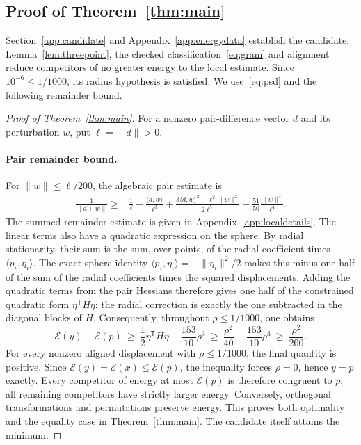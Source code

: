 \documentclass[11pt]{article}
\newcommand{\E}{\mathcal{E}}
\begin{document}
\subsection{Proof of Theorem~\ref{thm:main}}\label{sec:mainproof}
Section~\ref{app:candidate} and Appendix~\ref{app:energydata} establish the candidate.
Lemma~\ref{lem:threepoint}, the checked classification~\eqref{eq:gram} and alignment
reduce competitors of no greater energy to the local estimate.
Since $10^{-6}\leq1/1000$, its radius hypothesis is satisfied.
We use~\eqref{eq:psd} and the following remainder bound.
\begin{proof}[Proof of Theorem~\ref{thm:main}]
For a nonzero pair-difference vector $d$ and its
perturbation $w$, put $\ell=\|d\|>0$.

\paragraph{Pair remainder bound.}
For $\|w\|\leq \ell/200$, the algebraic pair estimate is
\begin{align}
 \frac1{\|d+w\|}\geq{}&\frac1\ell-\frac{\langle d,w\rangle}{\ell^3}
 +\frac{3\langle d,w\rangle^2-\ell^2\|w\|^2}{2\ell^5}
 -\frac{51}{50}\frac{\|w\|^3}{\ell^4}.\label{eq:remainder}
\end{align}
The summed remainder estimate is given in Appendix~\ref{app:localdetails}.
The linear terms also have a quadratic expression on the sphere.
By radial stationarity, their sum is the sum, over points, of the radial
coefficient times $\langle p_i,\eta_i\rangle$. The exact sphere identity
$\langle p_i,\eta_i\rangle=-\|\eta_i\|^2/2$ makes this minus one half of the
sum of the radial coefficients times the squared displacements. Adding
the quadratic terms from the pair Hessians therefore gives one half of
the constrained quadratic form $\eta^{\mathsf T}H\eta$: the radial correction
is exactly the one subtracted in the diagonal blocks of $H$.
Consequently, throughout $\rho\leq1/1000$, one obtains
\[
 \E(y)-\E(p)
 \ \geq\ \frac12 \eta^{\mathsf T}H\eta-\frac{153}{10}\rho^3
 \ \geq\ \frac{\rho^2}{40}-\frac{153}{10}\rho^3
 \ \geq\ \frac{\rho^2}{200}.
\]
For every nonzero aligned displacement with $\rho\leq1/1000$, the final
quantity is positive. Since $\E(y)=\E(x)\leq\E(p)$, the inequality forces
$\rho=0$, hence $y=p$ exactly. Every competitor of energy at most
$\E(p)$ is therefore congruent to $p$; all remaining competitors have
strictly larger energy. Conversely, orthogonal transformations and
permutations preserve energy. This proves both optimality and the
equality case in Theorem~\ref{thm:main}. The candidate itself attains the
minimum.

\end{proof}
\end{document}
